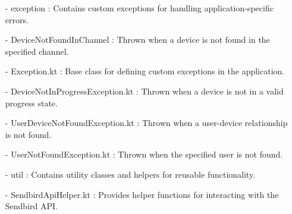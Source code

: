 \documentclass[conference]{IEEEtran}
\begin{document}
\begin{enumerate}
\begin{itemize}
\begin{itemize}
\begin{enumerate}
\begin{enumerate}
        \item[-] exception : Contains custom exceptions for handling application-specific errors.\\
        \item[-] DeviceNotFoundInChannel : Thrown when a device is not found in the specified channel. \\
        \item[-] Exception.kt : Base class for defining custom exceptions in the application.\\
        \item[-] DeviceNotInProgressException.kt : Thrown when a device is not in a valid progress state.\\
        \item[-] UserDeviceNotFoundException.kt : Thrown when a user-device relationship is not found. \\
        \item[-] UserNotFoundException.kt : Thrown when the specified user is not found.\\
        
        \item[-] util : Contains utility classes and helpers for reusable functionality. \\
        \item[-] SendbirdApiHelper.kt : Provides helper functions for interacting with the Sendbird API.\\
        
\end{enumerate}


\end{enumerate}
\end{itemize}
\end{itemize}
\end{enumerate}
\end{document}
